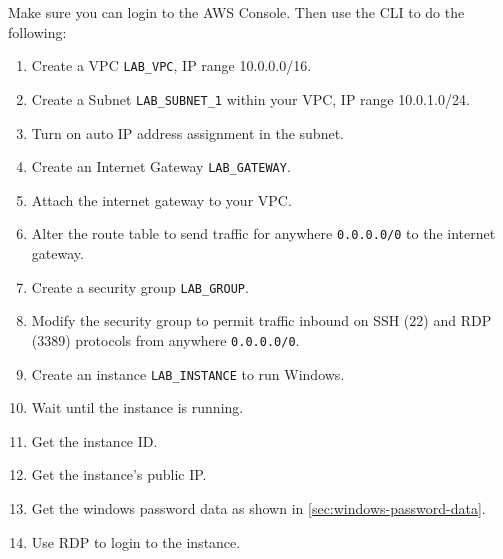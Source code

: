 Make sure you can login to the AWS Console.
Then use the CLI to do the following:
\begin{enumerate}
\item Create a VPC \texttt{LAB\_VPC}, IP range 10.0.0.0/16.
\item Create a Subnet \texttt{LAB\_SUBNET\_1} within your VPC, IP range 10.0.1.0/24.
\item Turn on auto IP address assignment in the subnet.
\item Create an Internet Gateway \texttt{LAB\_GATEWAY}.
\item Attach the internet gateway to your VPC.
\item Alter the route table to send traffic for anywhere \texttt{0.0.0.0/0} to the internet gateway.
\item Create a security group \texttt{LAB\_GROUP}.
\item Modify the security group to permit traffic inbound on SSH (22) and RDP (3389) protocols from anywhere \texttt{0.0.0.0/0}.
\item Create an instance \texttt{LAB\_INSTANCE} to run Windows.
\item Wait until the instance is running.
\item Get the instance ID.
\item Get the instance's public IP.
\item Get the windows password data as shown in \autoref{sec:windows-password-data}.
\item Use RDP to login to the instance.
\end{enumerate}



